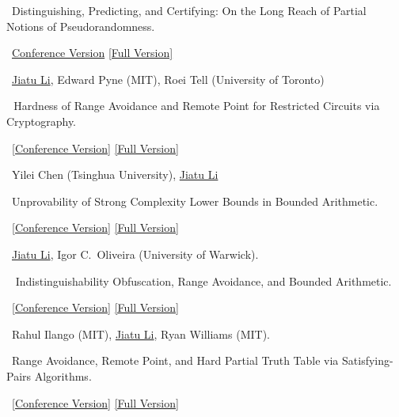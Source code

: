 \documentclass[a4paper, 11pt]{article}
\begin{document}
     \tagcc\ Distinguishing, Predicting, and Certifying: On the Long Reach of Partial Notions of Pseudorandomness. 
    
    \ \href{https://ieeexplore.ieee.org/document/10756069}{Conference Version} \href{https://eccc.weizmann.ac.il/report/2024/139/}{[Full Version]}
    
    \ \underline{Jiatu Li}, Edward Pyne (MIT), Roei Tell (University of Toronto) 
    \vspace{\pubskip}
    
     \tagcc\,\tagcr\ Hardness of Range Avoidance and Remote Point for Restricted Circuits via Cryptography. 
    
    \ \href{https://dl.acm.org/doi/10.1145/3618260.3649602}{[Conference Version]} \href{https://eccc.weizmann.ac.il/report/2023/206/}{[Full Version]}
    
    \ Yilei Chen (Tsinghua University), \underline{Jiatu Li}
    \vspace{\pubskip}

      \tagpf\ Unprovability of Strong Complexity Lower Bounds in Bounded Arithmetic. 
    
    \ \href{https://dl.acm.org/doi/10.1145/3564246.3585144}{[Conference Version]} \href{https://eccc.weizmann.ac.il/report/2023/022/}{[Full Version]}
    
    \ \underline{Jiatu Li}, Igor C.~Oliveira (University of Warwick).

    \vspace{\pubskip}
    
      \tagcc\,\tagpf\,\tagcr\ Indistinguishability Obfuscation, Range Avoidance, and Bounded Arithmetic. 
    
    \ \href{https://dl.acm.org/doi/abs/10.1145/3564246.3585187}{[Conference Version]} \href{https://eccc.weizmann.ac.il/report/2023/038/}{[Full Version]}
    
    \ Rahul Ilango (MIT), \underline{Jiatu Li}, Ryan Williams (MIT).
    
    \vspace{\pubskip}
    
     \tagcc\ Range Avoidance, Remote Point, and Hard Partial Truth Table via Satisfying-Pairs Algorithms. 
    
    \ \href{https://dl.acm.org/doi/10.1145/3564246.3585147}{[Conference Version]} \href{https://eccc.weizmann.ac.il/report/2023/072/}{[Full Version]}
    
\end{document}
